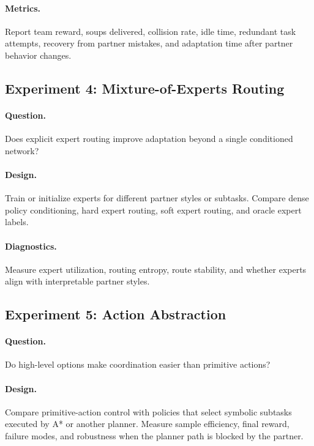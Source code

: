 \documentclass[letterpaper]{article} %
\begin{document}
\paragraph{Metrics.}
Report team reward, soups delivered, collision rate, idle time, redundant task attempts, recovery from partner mistakes, and adaptation time after partner behavior changes.

\subsection{Experiment 4: Mixture-of-Experts Routing}

\paragraph{Question.}
Does explicit expert routing improve adaptation beyond a single conditioned network?

\paragraph{Design.}
Train or initialize experts for different partner styles or subtasks. Compare dense policy conditioning, hard expert routing, soft expert routing, and oracle expert labels.

\paragraph{Diagnostics.}
Measure expert utilization, routing entropy, route stability, and whether experts align with interpretable partner styles.

\subsection{Experiment 5: Action Abstraction}

\paragraph{Question.}
Do high-level options make coordination easier than primitive actions?

\paragraph{Design.}
Compare primitive-action control with policies that select symbolic subtasks executed by A* or another planner. Measure sample efficiency, final reward, failure modes, and robustness when the planner path is blocked by the partner.
\end{document}
